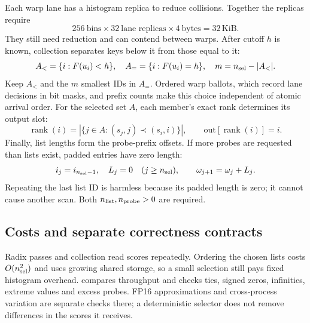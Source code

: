 Each warp lane has a histogram replica to reduce collisions. Together
the replicas require
\[
 256\ \text{bins}\times32\ \text{lane replicas}\times4\ \text{bytes}=32\,\mathrm{KiB}.
\]
They still need reduction and can contend between warps. After cutoff
$h$ is known, collection separates keys below it from those equal to it:
\[
 A_< =\{i:F(u_i)<h\},\quad A_= =\{i:F(u_i)=h\},\quad
 m=n_{\rm sel}-|A_<|.
\]
Keep $A_<$ and the $m$ smallest IDs in $A_=$. Ordered warp ballots,
which record lane decisions in bit masks, and prefix counts make this
choice independent of atomic arrival order. For the selected set $A$,
each member's exact rank determines its output slot:
\[
 \operatorname{rank}(i)=|\{j\in A:(s_j,j)\prec(s_i,i)\}|,
 \qquad\mathrm{out}[\operatorname{rank}(i)]=i.
\]
Finally, list lengths form the probe-prefix offsets. If more probes are
requested than lists exist, padded entries have zero length:
\[
 i_j=i_{n_{\rm sel}-1},\quad L_j=0\quad(j\geq n_{\rm sel}),
 \qquad\omega_{j+1}=\omega_j+L_j.
\]
Repeating the last list ID is harmless because its padded length is
zero; it cannot cause another scan. Both $n_{\rm list},n_{\rm probe}>0$
are required.

\subsection{Costs and separate correctness contracts}

Radix passes and collection read scores repeatedly. Ordering the chosen
lists costs $O(n_{\rm sel}^2)$ and uses growing shared storage, so a
small selection still pays fixed histogram overhead. 
compares throughput and checks ties, signed zeros, infinities, extreme
values and excess probes. FP16 approximations and cross-process
variation are separate checks there; a deterministic selector does not
remove differences in the scores it receives.
